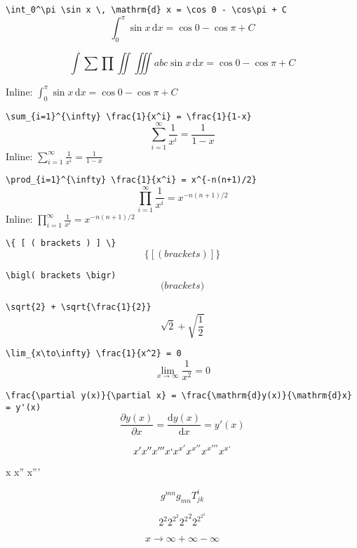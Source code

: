 \documentclass{article}
\begin{document}
\verb|\int_0^\pi \sin x \, \mathrm{d} x = \cos 0 - \cos\pi + C|
\[ \int_0^\pi \sin x \, \mathrm{d} x = \cos 0 - \cos\pi + C \]

\[ \int \sum \prod \iint \iiint abc \sin x \, \mathrm{d} x = \cos 0 - \cos\pi + C \]

Inline: $\int_0^\pi \sin x \, \mathrm{d} x = \cos 0 - \cos\pi + C$

\verb|\sum_{i=1}^{\infty} \frac{1}{x^i} = \frac{1}{1-x}|
\[ \sum_{i=1}^{\infty} \frac{1}{x^i} = \frac{1}{1-x} \]
Inline: $\sum_{i=1}^{\infty} \frac{1}{x^i} = \frac{1}{1-x}$

\verb|\prod_{i=1}^{\infty} \frac{1}{x^i} = x^{-n(n+1)/2}|
\[ \prod_{i=1}^{\infty} \frac{1}{x^i} = x^{-n(n+1)/2} \]
Inline: $\prod_{i=1}^{\infty} \frac{1}{x^i} = x^{-n(n+1)/2}$

\verb|\{ [ ( brackets ) ] \}|
\[ \{ [ ( brackets ) ] \} \]

\verb|\bigl( brackets \bigr)|
\[ \bigl( brackets \bigr) \]

\verb|\sqrt{2} + \sqrt{\frac{1}{2}}|
\[ \sqrt{2} + \sqrt{\frac{1}{2}} \]

\verb|\lim_{x\to\infty} \frac{1}{x^2} = 0|
\[ \lim_{x\to\infty} \frac{1}{x^2} = 0 \]

\verb|\frac{\partial y(x)}{\partial x} = \frac{\mathrm{d}y(x)}{\mathrm{d}x} = y'(x)|
\[ \frac{\partial y(x)}{\partial x} = \frac{\mathrm{d}y(x)}{\mathrm{d}x} = y'(x) \]

\[ x' x'' x''' x` x^{x'} x^{x''} x^{x'''} x^{x`}\]

{\firatext x x'' x'''}


\[ g^{mn} g_{mn} T^{i}_{jk} \]

\[ 2^2 2^{2^2} {2^2}^2 2^{2^{2^2}} \]

\[ x \to \infty + \infty - \infty \]
\end{document}
